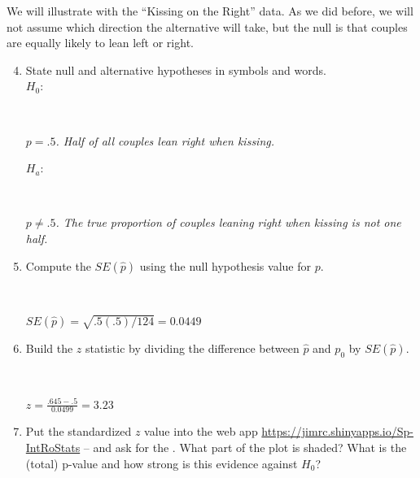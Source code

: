  We will illustrate with the ``Kissing on the Right'' data. As we did
 before, we will not assume which direction the alternative will
 take, but the null is that couples are equally likely to lean
 left or right. 
 
    \begin{enumerate}
\setcounter{enumi}{3}
    \item State null and alternative hypotheses in symbols and
      words.\\
      $H_0:$ 
\begin{students}
    \vspace{1.2cm}    \\
\end{students}
\begin{key} 
{\it $p = .5$.  Half of all couples lean right when kissing.}
\end{key}
$H_a:$
\begin{students}
    \vspace{.7cm}    \\
\end{students}

\begin{key} 
{\it $p \neq .5$.  The true proportion of couples leaning right when
  kissing is not one half.}
\end{key}
\item Compute the $SE(\widehat{p})$ using the null hypothesis value
  for $p$. 
\begin{students}
    \vspace{1cm}    \\
\end{students}

\begin{key} 
{\it $SE(\widehat{p}) = \sqrt{.5(.5)/124} = 0.0449$}
\end{key}

  \item Build the $z$ statistic by dividing the difference between
    $\widehat{p}$ and $p_0$ by $SE(\widehat{p})$. 
\begin{students}
    \vspace{1cm}    \\
\end{students}

\begin{key} 
{\it $z = \frac{.645 - .5}{0.0499} = 3.23$}
\end{key}

  \item Put the standardized $z$ value into the web app 
    \url{https://jimrc.shinyapps.io/Sp-IntRoStats}
     --  and ask for
    the .  What part of the plot is shaded?  What is
    the (total) p-value and how strong is this evidence against $H_0$?  
\begin{students}
    \vspace{1cm}    \\
\end{students}


\end{enumerate}
